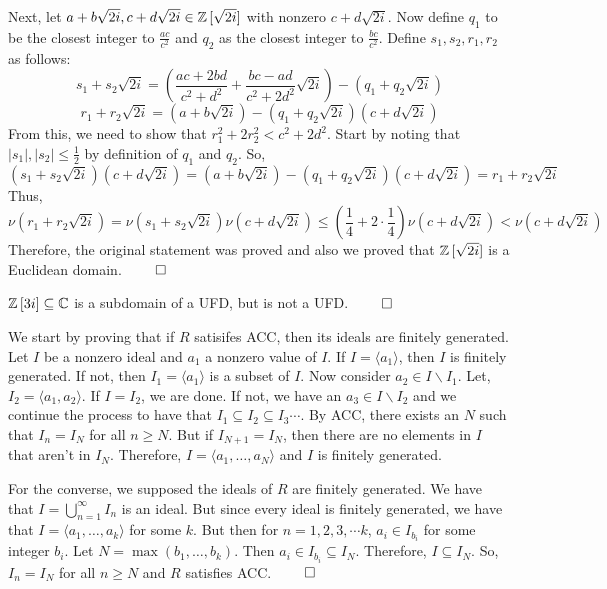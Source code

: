 \documentclass{report}
\begin{document}
\begin{enumerate}[label=\alph*.]
	Next, let $a+b\sqrt{2i}, c+d\sqrt{2i} \in \ZZ\,[\sqrt{2i}]$ with nonzero $c+d\sqrt{2i}$. Now define $q_1$ to be the closest integer to $\frac{ac}{c^2}$ and $q_2$ as the closest integer to $\frac{bc}{c^2}$. Define $s_1, s_2, r_1, r_2$ as follows:
	$$s_1 + s_2\sqrt{2i} = \left(\frac{ac+2bd}{c^2 + d^2} + \frac{bc-ad}{c^2+2d^2}\sqrt{2i}\right) - (q_1 + q_2\sqrt{2i})$$
	$$r_1 + r_2\sqrt{2i} = (a+b\sqrt{2i}) - \left(q_1+q_2\sqrt{2i}\right)(c+d\sqrt{2i})$$
	From this, we need to show that $r_1^2+2r_2^2 < c^2 + 2d^2$. Start by noting that $|s_1|, |s_2| \leq \frac{1}{2}$ by definition of $q_1$ and $q_2$. So, 
	$$(s_1+s_2\sqrt{2i})(c+d\sqrt{2i}) = (a+b\sqrt{2i}) - (q_1 + q_2\sqrt{2i})(c+d\sqrt{2i}) = r_1+r_2\sqrt{2i}$$
	Thus,
	$$\nu(r_1+r_2\sqrt{2i}) = \nu(s_1+s_2\sqrt{2i})\nu(c+d\sqrt{2i}) \leq \left(\frac{1}{4} + 2\cdot\frac{1}{4}\right)\nu(c+d\sqrt{2i}) < \nu(c+d\sqrt{2i})$$
	Therefore, the original statement was proved and also we proved that $\ZZ\,[\sqrt{2i}]$ is a Euclidean domain. $\qed$
\end{enumerate}

\sol $\ZZ\,[3i] \subseteq \CC$ is a subdomain of a UFD, but is not a UFD. $\qed$


\sol We start by proving that if $R$ satisifes ACC, then its ideals are finitely generated. Let $I$ be a nonzero ideal and $a_1$ a nonzero value of $I$. If $I = \langle a_1 \rangle$, then $I$ is finitely generated. If not, then $I_1 = \langle a_1 \rangle$ is a subset of $I$. Now consider $a_2 \in I \backslash I_1$. Let, $I_2 = \langle a_1, a_2 \rangle$. If $I=I_2$, we are done. If not, we have an $a_3 \in I \backslash I_2$ and we continue the process to have that $I_1 \subseteq I_2 \subseteq I_3 \cdots$. By ACC, there exists an $N$ such that $I_n = I_N$ for all $n \geq N$. But if $I_{N+1} = I_N$, then there are no elements in $I$ that aren't in $I_N$. Therefore, $I = \langle a_1, \ldots, a_N \rangle$ and $I$ is finitely generated.

For the converse, we supposed the ideals of $R$ are finitely generated. We have that $I = \bigcup_{n=1}^{\infty}I_n$ is an ideal. But since every ideal is finitely generated, we have that $I = \langle a_1, \ldots, a_k \rangle$ for some $k$. But then for $n = 1,2,3,\cdots k$, $a_i \in I_{b_i}$ for some integer $b_i$. Let $N = \max(b_1, \ldots, b_k)$. Then $a_i \in I_{b_i} \subseteq I_N$. Therefore, $I \subseteq I_N$. So, $I_n = I_N$ for all $n \geq N$ and $R$ satisfies ACC. $\qed$
\end{document}
